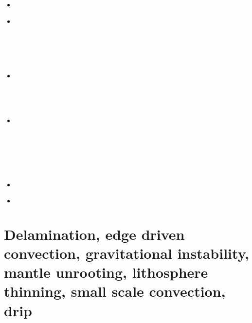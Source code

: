 \begin{scriptsize}
\begin{itemize}
 \\
 \\
 \\
\item[\twothousandsixteen] 
 \\
\item[\twothousandseventeen] 
 \\
 \\
 \\
 \\
 \\
\item[\twothousandeighteen]
 \\
 \\
 \\
 \\
\item[\twothousandnineteen] 
 \\
 \\
 \\
 \\
 \\
 \\
\item[\twothousandtwenty] 
\\
\item[\twothousandtwentythree] 
 \\
\end{itemize}
\end{scriptsize}


\section{Delamination, edge driven convection, gravitational instability, 
mantle unrooting, lithosphere thinning, small scale convection, drip} 

